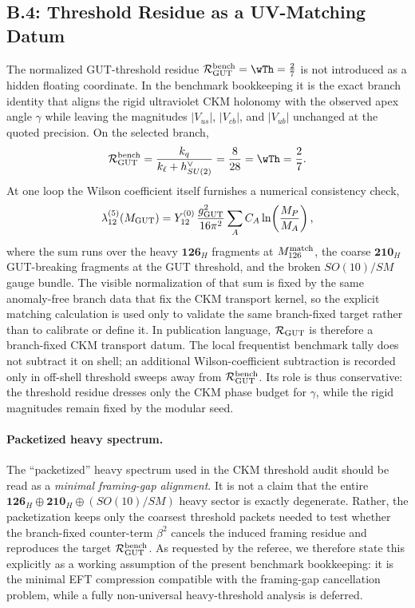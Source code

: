 \documentclass[11pt]{article}
\begin{document}
\subsection*{B.4: Threshold Residue as a UV-Matching Datum}

The normalized GUT-threshold residue $\mathcal R_{\rm GUT}^{\rm bench}=\wTh=\frac{2}{7}$ is not introduced as a hidden floating coordinate. In the benchmark bookkeeping it is the exact branch identity that aligns the rigid ultraviolet CKM holonomy with the observed apex angle $\gamma$ while leaving the magnitudes $|V_{us}|$, $|V_{cb}|$, and $|V_{ub}|$ unchanged at the quoted precision. On the selected branch,
\begin{equation}
 \mathcal R_{\rm GUT}^{\rm bench}
 =
 \frac{k_q}{k_{\ell}+h^{\vee}_{SU(2)}}
 = \frac{8}{28}
 = \wTh = \frac{2}{7}.
\end{equation}
At one loop the Wilson coefficient itself furnishes a numerical consistency check,
\begin{equation}
 \lambda_{12}^{(5)}(M_{\rm GUT})
 =
 Y_{12}^{(0)}\,\frac{g_{\rm GUT}^2}{16\pi^2}
 \sum_A C_A\ln\!\left(\frac{M_P}{M_A}\right),
\end{equation}
where the sum runs over the heavy $\mathbf{126}_H$ fragments at $M_{126}^{\rm match}$, the coarse $\mathbf{210}_H$ GUT-breaking fragments at the GUT threshold, and the broken $SO(10)/SM$ gauge bundle. The visible normalization of that sum is fixed by the same anomaly-free branch data that fix the CKM transport kernel, so the explicit matching calculation is used only to validate the same branch-fixed target rather than to calibrate or define it. In publication language, $\mathcal R_{\rm GUT}$ is therefore a branch-fixed CKM transport datum. The local frequentist benchmark tally does not subtract it on shell; an additional Wilson-coefficient subtraction is recorded only in off-shell threshold sweeps away from $\mathcal R_{\rm GUT}^{\rm bench}$. Its role is thus conservative: the threshold residue dresses only the CKM phase budget for $\gamma$, while the rigid magnitudes remain fixed by the modular seed.

\paragraph{Packetized heavy spectrum.}
The ``packetized'' heavy spectrum used in the CKM threshold audit should be read as a \emph{minimal framing-gap alignment}. It is not a claim that the entire $\mathbf{126}_H\oplus\mathbf{210}_H\oplus(SO(10)/SM)$ heavy sector is exactly degenerate. Rather, the packetization keeps only the coarsest threshold packets needed to test whether the branch-fixed counter-term $\beta^2$ cancels the induced framing residue and reproduces the target $\mathcal R_{\rm GUT}^{\rm bench}$. As requested by the referee, we therefore state this explicitly as a working assumption of the present benchmark bookkeeping: it is the minimal EFT compression compatible with the framing-gap cancellation problem, while a fully non-universal heavy-threshold analysis is deferred.
\end{document}
